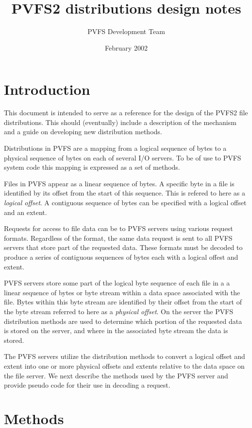 \documentclass[11pt]{article}
\title{PVFS2 distributions design notes}
\author{PVFS Development Team}
\date{February 2002}
\begin{document}
\maketitle

\section{Introduction}

This document is intended to serve as a reference for the design of the
PVFS2 file distributions. This should (eventually) include a description
of the mechanism and a guide on developing new distribution methods.

Distributions in PVFS are a mapping from a logical sequence of bytes
to a physical sequence of bytes on each of several I/O servers.  To
be of use to PVFS system code this mapping is expressed as a set of
methods.

Files in PVFS appear as a linear sequence of bytes.  A specific byte
in a file is identified by its offset from the start of this sequence.
This is refered to here as a {\it logical offset}.  A contiguous
sequence of bytes can be specified with a logical offset and an extent.

Requests for access to file data can be to PVFS servers using various
request formats.  Regardless of the format, the same data request is
sent to all PVFS servers that store part of the requested data.  These
formats must be decoded to produce a series of contiguous sequences of
bytes each with a logical offest and extent.

PVFS servers store some part of the logical byte sequence of each file
in a a linear sequence of bytes or byte stream within a data space
associated with the file.
Bytes within this byte stream are identified by their offset from the
start of the byte stream referred to here as a {\it physical offset}.
On the server the PVFS distribution methods are used to determine which
portion of the requested data is stored on the server, and where in
the associated byte stream the data is stored.

The PVFS servers utilize the distribution methods to convert a logical
offset and extent into one or more physical offsets and extents relative
to the data space on the file server.  We next describe the methods used
by the PVFS server and provide pseudo code for their use in decoding
a request.

\section{Methods}
\end{document}
